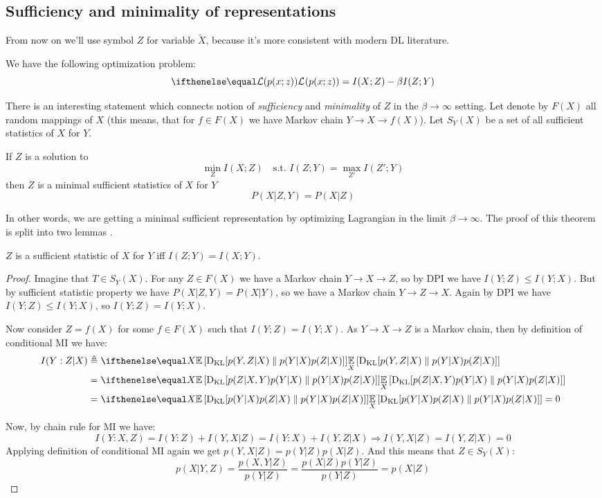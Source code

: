 \documentclass{article}
\begin{document}
\subsection{Sufficiency and minimality of representations}
From now on we'll use symbol $Z$ for variable $\tilde{X}$, because it's more consistent with modern DL literature.

We have the following optimization problem:
\[
\loss{p(x;z)} = I(X;Z) - \beta I(Z; Y)
\]

There is an interesting statement which connects notion of \textit{sufficiency} and \textit{minimality} of $Z$ in the $\beta \to \infty$ setting.
Let denote by $F(X)$ all random mappings of $X$ (this means, that for $f \in F(X)$ we have Markov chain $Y \to X \to f(X)$).
Let $S_Y(X)$ be a set of all sufficient statistics of $X$ for $Y$.

\begin{proposition}
If $Z$ is a solution to
\[
\min_{Z} I(X; Z) \quad\text{s.t. } I(Z;Y) = \max_{Z'} I(Z'; Y)
\]
then $Z$ is a minimal sufficient statistics of $X$ for $Y$
\[
P(X|Z,Y) = P(X|Z)
\]
\end{proposition}

In other words, we are getting a minimal sufficient representation by optimizing Lagrangian in the limit $\beta \to \infty$.
The proof of this theorem is split into two lemmas \cite{IB_learning_and_generalization}.

\begin{lemma}
    $Z$ is a sufficient statistic of $X$ for $Y$ iff $I(Z;Y) = I(X;Y)$.
\end{lemma}

\begin{proof}
Imagine that $T \in S_Y(X)$.
For any $Z \in F(X)$ we have a Markov chain $Y \to X \to Z$, so by DPI we have $I(Y;Z) \leq I(Y;X)$.
But by sufficient statistic property we have $P(X|Z,Y) = P(X|Y)$, so we have a Markov chain $Y \to Z \to X$.
Again by DPI we have $I(Y;Z) \leq I(Y;X)$, so $I(Y;Z) = I(Y;X)$.

Now consider $Z = f(X)$ for some $f \in F(X)$ such that $I(Y;Z) = I(Y;X)$.
As $Y \to X \to Z$ is a Markov chain, then by definition of conditional MI we have:
\[
\begin{split}
I(Y:Z|X) &\triangleq \expect[X]{\kl{p(Y,Z|X)}{p(Y|X)p(Z|X)}} \\
&= \expect[X]{\kl{p(Z|X,Y)p(Y|X)}{p(Y|X)p(Z|X)}} \\
&= \expect[X]{\kl{p(Y|X)p(Z|X)}{p(Y|X)p(Z|X)}} = 0
\end{split}
\]

Now, by chain rule for MI we have:
\[
I(Y : X,Z) = I(Y : Z) + I(Y,X|Z) = I(Y : X) + I(Y,Z|X) \Longrightarrow I(Y,X|Z) = I(Y,Z|X) = 0
\]
Applying definition of conditional MI again we get $p(Y,X|Z) = p(Y|Z)p(X|Z)$.
And this means that $Z \in S_Y(X)$:
\[
p(X|Y,Z) = \frac{p(X,Y|Z)}{p(Y|Z)} = \frac{p(X|Z) p(Y|Z)}{p(Y|Z)} = p(X|Z)
\]
\end{proof}
\end{document}
